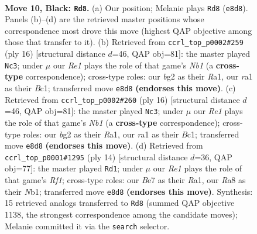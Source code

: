 \documentclass[11pt]{article}
\begin{document}
\clearpage

\begin{figure}[p]\centering
\begin{subfigure}{0.46\textwidth}\centering
\resizebox{\linewidth}{!}{%
\newchessgame
\chessboard[
  setfen={rnb1r1k1/ppq1bppp/4pn2/2pp4/P1P1P2P/3P1NP1/1P1N1PB1/R1BQ1RK1 b - - 0 10},
  showmover=false,
  pgfstyle=straightmove, color=movearrow, markmove={e8-d8}
]}
\caption{}
\end{subfigure}\hfill
\begin{subfigure}{0.46\textwidth}\centering
\resizebox{\linewidth}{!}{%
\newchessgame
\chessboard[
  setfen={r1bqr1k1/pppn1pbp/3p1np1/4p3/2PP4/5NP1/PPQ1PPBP/RNBR2K1 w - - 2 9},
  showmover=false,
  pgfstyle=straightmove, color=movearrow, markmove={b1-c3}
]}
\caption{}
\end{subfigure}
\\[4pt]
\begin{subfigure}{0.46\textwidth}\centering
\resizebox{\linewidth}{!}{%
\newchessgame
\chessboard[
  setfen={r1bqr1k1/pppn1pbp/3p1np1/4p3/2PP4/5NP1/PPQ1PPBP/RNBR2K1 w - - 2 9},
  showmover=false,
  pgfstyle=straightmove, color=movearrow, markmove={b1-c3}
]}
\caption{}
\end{subfigure}\hfill
\begin{subfigure}{0.46\textwidth}\centering
\resizebox{\linewidth}{!}{%
\newchessgame
\chessboard[
  setfen={r1bq1rk1/pppn1pbp/3p1np1/4p3/2PP4/5NP1/PPQ1PPBP/RNB2RK1 w - - 0 8},
  showmover=false,
  pgfstyle=straightmove, color=movearrow, markmove={f1-d1}
]}
\caption{}
\end{subfigure}
\caption{\textbf{Move 10, Black: \texttt{Rd8}.} (a) Our position; Melanie plays \texttt{Rd8} (\texttt{e8d8}). Panels (b)--(d) are the retrieved master positions whose correspondence most drove this move (highest QAP objective among those that transfer to it). (b) Retrieved from \texttt{ccrl\_top\_p0002\#259} (ply 16) [structural distance $d$=46, QAP obj=81]: the master played \texttt{Nc3}; under $\mu$ our \emph{Re1} plays the role of that game's \emph{Nb1} (a \textbf{cross-type} correspondence); cross-type roles: our \emph{b}g2 as their \emph{R}a1, our \emph{r}a1 as their \emph{B}c1; transferred move \texttt{e8d8} \textbf{(endorses this move)}. (c) Retrieved from \texttt{ccrl\_top\_p0002\#260} (ply 16) [structural distance $d$=46, QAP obj=81]: the master played \texttt{Nc3}; under $\mu$ our \emph{Re1} plays the role of that game's \emph{Nb1} (a \textbf{cross-type} correspondence); cross-type roles: our \emph{b}g2 as their \emph{R}a1, our \emph{r}a1 as their \emph{B}c1; transferred move \texttt{e8d8} \textbf{(endorses this move)}. (d) Retrieved from \texttt{ccrl\_top\_p0001\#1295} (ply 14) [structural distance $d$=36, QAP obj=77]: the master played \texttt{Rd1}; under $\mu$ our \emph{Re1} plays the role of that game's \emph{Rf1}; cross-type roles: our \emph{B}e7 as their \emph{R}a1, our \emph{R}a8 as their \emph{N}b1; transferred move \texttt{e8d8} \textbf{(endorses this move)}. Synthesis: 15 retrieved analogs transferred to \texttt{Rd8} (summed QAP objective 1138, the strongest correspondence among the candidate moves); Melanie committed it via the \texttt{search} selector.}
\label{fig:thought-m19}
\end{figure}
\end{document}

